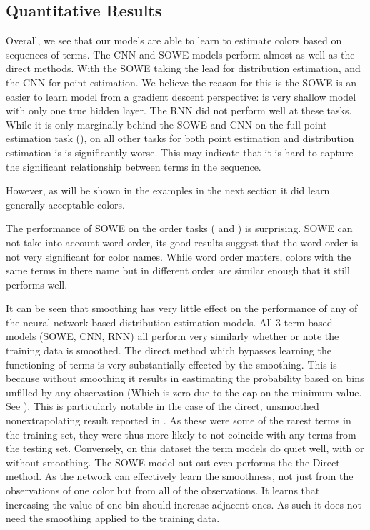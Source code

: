 \documentclass[11pt,a4paper]{article}
\begin{document}
	\clearpage


\subsection{Quantitative Results}

Overall, we see that our models are able to learn to estimate colors based on sequences of terms.
The CNN and SOWE models perform almost as well as the direct methods.
With the SOWE taking the lead for distribution estimation, and the CNN for point estimation.
We believe the reason for this is the SOWE is an easier to learn model from a gradient descent perspective: is very shallow model with only one true hidden layer.
The RNN did not perform well at these tasks.
While it is only marginally behind the SOWE and CNN on the full point estimation task (), on all other tasks for both point estimation and distribution estimation is is significantly worse.
This may indicate that it is  hard to capture the significant relationship between terms in the sequence.

However, as will be shown in the examples in the next section it did learn generally acceptable colors.


The performance of SOWE on the order tasks ( and ) is surprising.
SOWE can not take into account word order, its good results suggest that the word-order is not very significant for color names.
While word order matters, colors with the same terms in there name but in different order are similar enough that it still performs well.



It can be seen that smoothing has very little effect on the performance of any of the neural network based distribution estimation models.
All 3 term based models (SOWE, CNN, RNN) all perform very similarly whether or note the training data is smoothed.
The direct method which bypasses learning the functioning of terms is very substantially effected by the smoothing.
This is because without smoothing it results in eastimating the probability based on bins unfilled by any observation (Which is zero due to the cap on the minimum value. See ).
This is particularly notable in the case of the direct, unsmoothed nonextrapolating result reported in . As these were some of the rarest terms in the training set, they were thus more likely to not coincide with any terms from the testing set.
Conversely, on this dataset the term models do quiet well, with or without smoothing. The SOWE model out out even performs the the Direct method.
As the network can effectively learn the smoothness, not just from the observations of one color but from all of the observations.
It learns that increasing the value of one bin should increase adjacent ones.
As such it does not need the smoothing applied to the training data.
\end{document}
